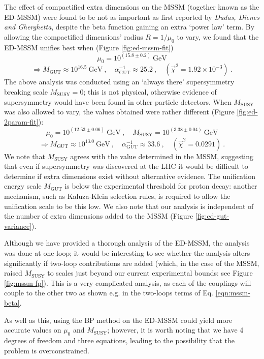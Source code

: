 \documentclass[12pt,a4paper,oneside]{article}
\begin{document}
The effect of compactified extra dimensions on the MSSM (together known as the ED-MSSM) were found to be not as important as first reported by \textit{Dudas, Dienes and Gherghetta}, despite the beta function gaining an extra `power law' term. By allowing the compactified dimensions' radius $R = 1/\mu_0$ to vary, we found that the ED-MSSM unifies best when (Figure \ref{fig:ed-mssm-fit})
\singlespace
\[ \mu_0 = 10^{(15.8 \pm 0.2)} \:\mathrm{GeV} \]
\[ \Rightarrow M_\mathrm{GUT} \approx 10^{16.5} \:\mathrm{GeV}\:, \quad \alpha_\mathrm{GUT}^{-1} \approx 25.2 \:, \quad (\overrightarrow{\chi}^2 = 1.92 \times 10^{-3}) \:. \]
\doublespace
The above analysis was conducted using an `always there' supersymmetry breaking scale $M_\mathrm{SUSY} = 0$; this is not physical, otherwise evidence of supersymmetry would have been found in other particle detectors. When $M_\mathrm{SUSY}$ was also allowed to vary, the values obtained were rather different (Figure \ref{fig:ed-2param-fit}):
\singlespace
\[ \mu_0 = 10^{(12.53 \pm 0.06)} \:\mathrm{GeV}\:, \quad M_\mathrm{SUSY} = 10^{(3.38 \pm 0.04)} \:\mathrm{GeV} \]
\[ \Rightarrow M_\mathrm{GUT} \approx 10^{13.0} \:\mathrm{GeV}\:, \quad \alpha_\mathrm{GUT}^{-1} \approx 33.6 \:, \quad (\overrightarrow{\chi}^2 = 0.0291) \:. \]
\doublespace
We note that $M_\mathrm{SUSY}$ agrees with the value determined in the MSSM, suggesting that even if supersymmetry was discovered at the LHC it would be difficult to determine if extra dimensions exist without alternative evidence. The unification energy scale $M_\mathrm{GUT}$ is below the experimental threshold for proton decay: another mechanism, such as Kaluza-Klein selection rules, is required to allow the unification scale to be this low. We also note that our analysis is independent of the number of extra dimensions added to the MSSM (Figure \ref{fig:ed-gut-variance}).

Although we have provided a thorough analysis of the ED-MSSM, the analysis was done at one-loop; it would be interesting to see whether the analysis alters significantly if two-loop contributions are added (which, in the case of the MSSM, raised $M_\mathrm{SUSY}$ to scales just beyond our current experimental bounds: see Figure \ref{fig:mssm-fp}). This is a very complicated analysis, as each of the couplings will couple to the other two as shown e.g. in the two-loops terms of Eq. \ref{eqn:mssm-beta}.

As well as this, using the BP method on the ED-MSSM could yield more accurate values on $\mu_0$ and $M_\mathrm{SUSY}$; however, it is worth noting that we have 4 degrees of freedom and three equations, leading to the possibility that the problem is overconstrained.
\end{document}
